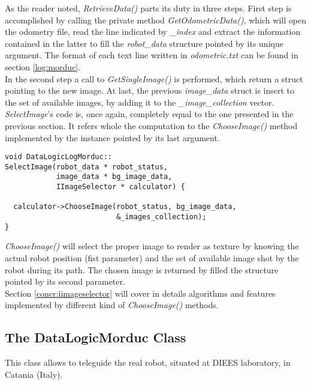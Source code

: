 As the reader noted, \textit{RetrieveData()} parts its duty in
three steps. First step is accomplished by calling the private method
\textit{GetOdometricData()}, which will open the odometry file, read
the line indicated by \textit{\_index} and extract the information
contained in the latter to fill the \textit{robot\_data} structure
pointed by its unique argument. The format of each text line written in
\textit{odometric.txt} can be found in section \ref{log:morduc}.
\\
In the second step a call to \textit{GetSingleImage()} is performed,
which return a struct pointing to the new image.
At last, the previous \textit{image\_data} struct is insert to the set
of available images, by adding it to the \textit{\_image\_collection}
vector.
\\
\textit{SelectImage}'s code is, once again, completely equal to the one
presented in the previous section. It refers whole the computation to the
\textit{ChooseImage()} method implemented by the instance pointed by
its last argument.
\\
\begin{lstlisting}[caption={\texttt{DataLogicLogSimulator::SelectImage()} method},
    label={code:datalogiclogmorduc:selectimage}]
void DataLogicLogMorduc::
SelectImage(robot_data * robot_status,
            image_data * bg_image_data,
            IImageSelector * calculator) {

  calculator->ChooseImage(robot_status, bg_image_data,
                          &_images_collection);
}

\end{lstlisting}

\textit{ChooseImage()} will select the proper image to render as texture
by knowing the actual robot position (fist parameter) and the set of available
image shot by the robot during its path. The chosen image is returned by filled
the structure pointed by its second parameter.
\\
Section \ref{concr:iimageselector} will cover in details algorithms and
features implemented by different kind of \textit{ChooseImage()} methods.

\subsection{The DataLogicMorduc Class}
\label{concr:idatalogic:datalogicmorduc}

This class allows \framework{} to teleguide the real \morduc{}
robot, situated at DIEES laboratory, in Catania (Italy).
